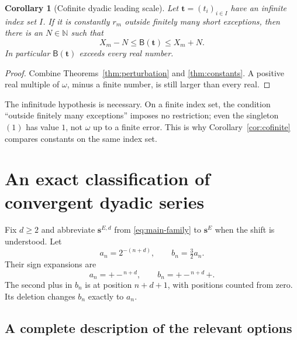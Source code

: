 \documentclass[11pt,letterpaper]{article}
\newtheorem{corollary}[theorem]{Corollary}
\theoremstyle{definition}
\theoremstyle{remark}
\newcommand{\NN}{\mathbb N}
\newcommand{\BB}{\mathsf B}
\newcommand{\bs}{\boldsymbol{s}}
\newcommand{\bt}{\boldsymbol{t}}
\newcommand{\signplus}{\mathtt{+}}
\newcommand{\signminus}{\mathtt{-}}
\begin{document}
\begin{corollary}[Cofinite dyadic leading scale]\label{cor:dyadic-tail}
Let $\bt=(t_i)_{i\in I}$ have an infinite index set $I$. If it is constantly
$r_m$ outside finitely many short exceptions, then there is an $N\in\NN$ such that
\begin{equation}\label{eq:tail-bound}
                              X_m-N\leq\BB(\bt)\leq X_m+N.
\end{equation}
In particular $\BB(\bt)$ exceeds every real number.
\end{corollary}
\begin{proof}
Combine Theorems~\ref{thm:perturbation} and \ref{thm:constants}. A positive real
multiple of $\omega$, minus a finite number, is still larger than every real.
\end{proof}

The infinitude hypothesis is necessary. On a finite index set, the condition
``outside finitely many exceptions'' imposes no restriction; even the singleton
$(1)$ has value $1$, not $\omega$ up to a finite error. This is why
Corollary~\ref{cor:cofinite} compares constants on the same index set.

\section{An exact classification of convergent dyadic series}\label{sec:classification}

Fix $d\geq2$ and abbreviate $\bs^{E,d}$ from \eqref{eq:main-family} to $\bs^E$
when the shift is understood. Let
\[
                        a_n=2^{-(n+d)},\qquad b_n=\tfrac32a_n.
\]
Their sign expansions are
\begin{equation}\label{eq:ab-signs}
 a_n=\signplus\,\signminus^{\,n+d},\qquad
 b_n=\signplus\,\signminus^{\,n+d}\,\signplus.
\end{equation}
The second plus in $b_n$ is at position $n+d+1$, with positions counted from
zero. Its deletion changes $b_n$ exactly to $a_n$.

\subsection{A complete description of the relevant options}
\end{document}
